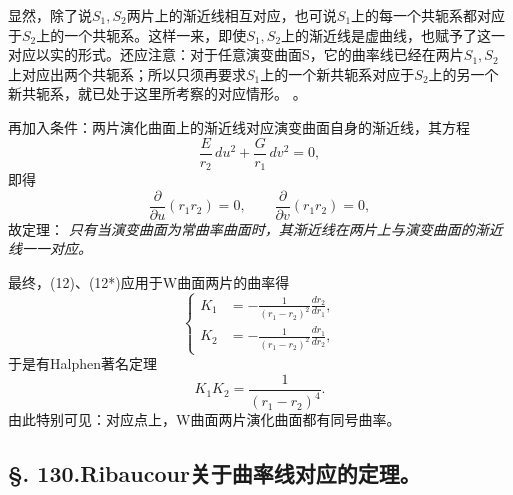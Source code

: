 显然，除了说\(S_1,S_2\)两片上的渐近线相互对应，也可说\(S_1\)上的每一个共轭系都对应于\(S_2\)上的一个共轭系。这样一来，即使\(S_1,S_2\)上的渐近线是虚曲线，也赋予了这一对应以实的形式。还应注意：对于任意演变曲面S，它的曲率线已经在两片\(S_1,S_2\)上对应出两个共轭系；所以只须再要求\(S_1\)上的一个新共轭系对应于\(S_2\)上的另一个新共轭系，就已处于这里所考察的对应情形。
。

再加入条件：两片演化曲面上的渐近线对应演变曲面自身的渐近线，其方程
\[
 \frac E{r_2}\,du^2+\frac G{r_1}\,dv^2=0,
\]
即得
\[
 \frac\partial{\partial u}(r_1r_2)=0,
  \qquad
 \frac\partial{\partial v}(r_1r_2)=0,
\]
故定理：
\emph{只有当演变曲面为常曲率曲面时，其渐近线在两片上与演变曲面的渐近线一一对应。}

最终，(12)、(12*)应用于W曲面两片的曲率得
\begin{equation}\tag{16}
 \left\{
 \begin{aligned}
 K_1&=-\frac1{(r_1-r_2)^2}\frac{dr_2}{dr_1},\\
 K_2&=-\frac1{(r_1-r_2)^2}\frac{dr_1}{dr_2},
 \end{aligned}
 \right.
\end{equation}
于是有Halphen著名定理
\begin{equation}\tag{17}
 K_1K_2=\frac1{(r_1-r_2)^4}.
\end{equation}
由此特别可见：对应点上，W曲面两片演化曲面都有同号曲率。

\subsection*{\S. 130.\quad Ribaucour关于曲率线对应的定理。}

